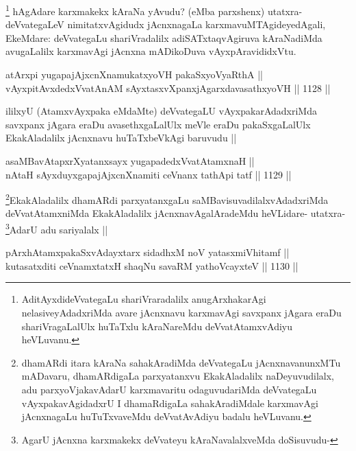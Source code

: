 \begin{artha}
\footnote{AditAyxdideVvategaLu shariVraradalilx anugArxhakarAgi nelasiveyAdadxriMda avare jAcnxnavu karxmavAgi savxpanx jAgara eraDu shariVragaLalUlx huTaTxlu kAraNareMdu deVvatAtamxvAdiyu heVLuvanu.}
hAgAdare karxmakekx kAraNa yAvudu? (eMba parxshenx) utatxra-deVvategaLeV nimitatxvAgidudx jAcnxnagaLa karxmavuMTAgideyedAgali, EkeMdare: deVvategaLu shariVradalilx adiSATxtaqvAgiruva kAraNadiMda avugaLalilx karxmavAgi jAcnxna mADikoDuva vAyxpAravididxVtu.
\end{artha}


\begin{shl}
atArxpi yugapajAjxcnXnamukatxyoVH pakaSxyoVyaRthA || \\
vAyxpitAvxdedxVvatAnAM sAyxtasxvXpanxjAgarxdavasathxyoVH ||  1128 ||  
\end{shl}

\begin{artha}
ililxyU (AtamxvAyxpaka eMdaMte) deVvategaLU vAyxpakarAdadxriMda savxpanx jAgara eraDu avasethxgaLalUlx meVle eraDu pakaSxgaLalUlx EkakAladalilx jAcnxnavu huTaTxbeVkAgi baruvudu ||
\end{artha}


\begin{shl}
asaMBavAtapxrXyatanxsayx yugapadedxVvatAtamxnaH || \\
nAtaH sAyxduyxgapajAjxcnXnamiti ceVnanx tathA\s pi tatf ||  1129 ||  
\end{shl}

\begin{artha}
\footnote{dhamARdi itara kAraNa sahakAradiMda deVvategaLu jAcnxnavanunxMTu mADavaru, dhamARdigaLa parxyatanxvu EkakAladalilx naDeyuvudilalx, adu parxyoVjakavAdarU karxmavaritu odaguvudariMda deVvategaLu vAyxpakavAgidadxrU I dhamaRdigaLa sahakAradiMdale karxmavAgi jAcnxnagaLu huTuTxvaveMdu deVvatAvAdiyu badalu heVLuvanu.}EkakAladalilx dhamARdi parxyatanxgaLu saMBavisuvadilalxvAdadxriMda deVvatAtamxniMda EkakAladalilx jAcnxnavAgalAradeMdu heVLidare- utatxra- \footnote{AgarU jAcnxna karxmakekx deVvateyu kAraNavalalxveMda doSisuvudu-}AdarU adu sariyalalx ||
\end{artha}

\begin{shl}
pArxhA\s \s tamxpakaSxvAdayxtarx sidadhxM noV yatasxmiVhitamf ||  \\
kutasatxditi ceVnamxtatxH shaqNu savaRM yathoVcayxteV ||  1130 ||  
\end{shl}

